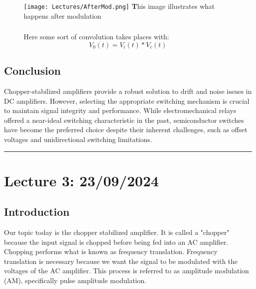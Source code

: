\documentclass[a4paper,9pt,twoside,openany,twocolumn]{memoir}
\begin{document}
\begin{figure}[H]  %
    \begin{minipage}[b]{0.4\textwidth}  %
        \begin{tcolorbox}[width=\textwidth, colback=white, boxrule=0.5mm, colframe=black, rounded corners]

            \texttt{[image: Lectures/AfterMod.png]}  %
            {\footnotesize \textbf This image illustrates what happens after modulation}
        \end{tcolorbox}
    \end{minipage}%
    \hfill  %
    \begin{minipage}[b]{0.4\textwidth}  %
        \small
        \subsubsection*{}
Here some sort of convolution takes places with:
$$
V_{0}(t) = V_{i}(t) * V_{c}(t)
$$

    \end{minipage}
\end{figure}
\subsection{Conclusion}
Chopper-stabilized amplifiers provide a robust solution to drift and noise issues in DC amplifiers. However, selecting the appropriate switching mechanism is crucial to maintain signal integrity and performance. While electromechanical relays offered a near-ideal switching characteristic in the past, semiconductor switches have become the preferred choice despite their inherent challenges, such as offset voltages and unidirectional switching limitations.
\begin{center}\rule{0.5\linewidth}{0.5pt}\end{center}

\section*{Lecture 3: 23/09/2024}

\subsection{Introduction}
Our topic today is the chopper stabilized amplifier. It is called a "chopper" because the input signal is chopped before being fed into an AC amplifier. Chopping performs what is known as frequency translation. Frequency translation is necessary because we want the signal to be modulated with the voltages of the AC amplifier. This process is referred to as amplitude modulation (AM), specifically pulse amplitude modulation.
\end{document}
